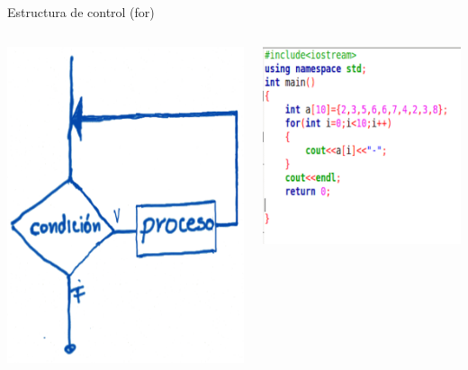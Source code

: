 \documentclass[presentation, aspectratio=54]{beamer}
\begin{document}
\begin{frame}[label={sec:org56fc702}]{Estructura de control (for)}
\begin{columns}
\begin{column}{0.4\columnwidth}
\begin{center}
\includegraphics[width=.9\linewidth]{./images/codigo/for.png}
\end{center}
\end{column}
\begin{column}{0.6\columnwidth}
\begin{center}
\includegraphics[width=.9\linewidth]{./images/codigo/code-for.png}

\end{center}
\end{column}
\end{columns}
\end{frame}
\end{document}
